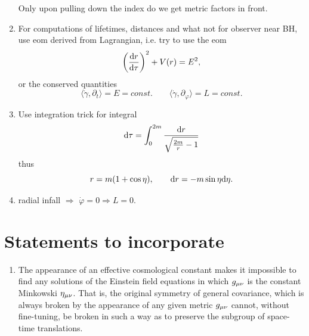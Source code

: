 \begin{enumerate}
\begin{equation}
\end{equation}
Only upon pulling down the index do we get metric factors in front.
\item For computations of lifetimes, distances and what not for observer near BH, use eom derived from Lagrangian, i.e. try to use the eom
\begin{equation}
	\left(\frac{\mathrm{d} r}{\mathrm{d} \tau}\right)^2 + V(r) = E^2,
\end{equation}
or the conserved quantities 
\begin{equation}
	\langle \dot{\gamma} , \partial_t\rangle = E= const. \qquad \langle \dot{\gamma},\partial_\varphi\rangle = L =const.
	\end{equation}

\item Use integration trick for integral
\begin{equation}
	\mathrm{d} \tau = \int_0^{2m} \frac{\mathrm{d} r}{\sqrt{\frac{2m}{r} -1}}
\end{equation}
thus
\begin{equation}
	r = m(1+\cos \eta),\qquad \mathrm{d} r = - m \sin \eta \mathrm{d} \eta.
\end{equation}
\item radial infall $\Rightarrow$ $\dot{\varphi}=0 \Rightarrow L=0$.
\end{enumerate}
\section{Statements to incorporate}
\begin{enumerate}
	\item The
	appearance of an effective cosmological constant makes it
	impossible to find any solutions of the Einstein field equations in which $g_{\mu \nu}$ is the constant Minkowski  $\eta_{\mu \nu}$. That is, the original symmetry of general covariance,
	which is always broken by the appearance of any given
	metric $g_{\mu \nu}$
	cannot, without fine-tuning, be broken in
	such a way as to preserve the subgroup of space-time
	translations.
\end{enumerate}